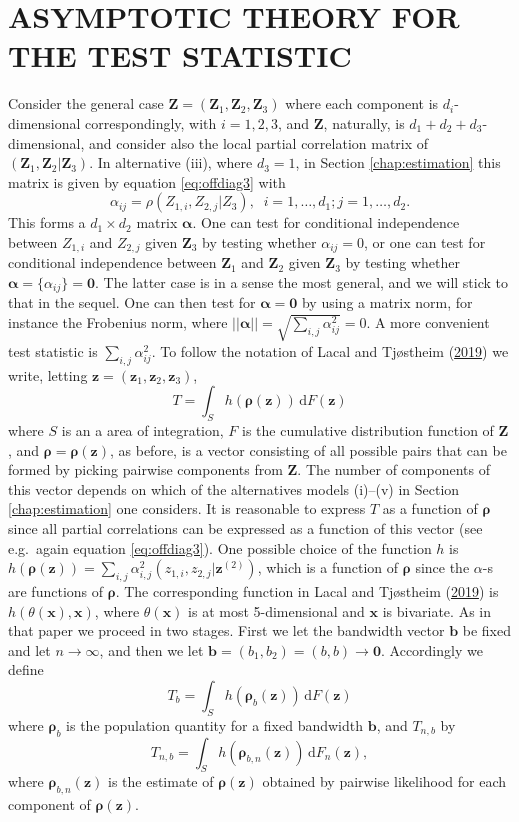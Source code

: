 \documentclass[
  12pt,
  letterpaper]{article}
\numberwithin{equation}{section}
\newcommand{\x}{\bm{x}}
\newcommand{\Z}{\bm{Z}}
\newcommand{\z}{\bm{z}}
\newcommand{\ztwo}{\bm{z}^{(2)}}
\newcommand{\frho}{\bm{\rho}}
\newcommand{\bb}{\bm{b}}
\newcommand{\falpha}{\bm{\alpha}}
\newcommand{\di}{\,\textrm{d}}
\begin{document}
\hypertarget{asym-test}{%
\section{ASYMPTOTIC THEORY FOR THE TEST STATISTIC}\label{asym-test}}

Consider the general case \(\Z = (\Z_1, \Z_2, \Z_3)\) where each component is \(d_i\)-dimensional correspondingly, with \(i = 1,2,3\), and \(\Z\), naturally, is \(d_1+d_2+d_3\)-dimensional, and consider also the local partial correlation matrix of \((\Z_1,\Z_2|\Z_3)\). In alternative (iii), where \(d_3 = 1\), in Section \ref{chap:estimation} this matrix is given by equation \eqref{eq:offdiag3} with
\[
\alpha_{ij} = \rho(Z_{1,i},Z_{2,j}|Z_3), \;\; i=1,\ldots,d_1; j = 1,\dots,d_2.
\]
This forms a \(d_1 \times d_2\) matrix \({\falpha}\). One can test for conditional independence between \(Z_{1,i}\) and \(Z_{2,j}\) given \(\Z_3\) by testing whether \(\alpha_{ij}=0\), or one can test for conditional independence between \(\Z_1\) and \(\Z_2\) given \(\Z_3\) by testing whether \({\falpha} = \{\alpha_{ij}\} = {\bm{0}}\). The latter case is in a sense the most general, and we will stick to that in the sequel. One can then test for \({\falpha} = {\bm{0}}\) by using a matrix norm, for instance the Frobenius norm, where \(||{\falpha}|| = \sqrt{\sum_{i,j} \alpha_{ij}^2} = 0\). A more convenient test statistic is \(\sum_{i,j} \alpha_{ij}^2\). To follow the notation of Lacal and Tjøstheim (\protect\hyperlink{ref-lacal2018estimating}{2019}) we write, letting \(\z=(\z_1,\z_2,\z_3)\),
\[
T = \int_S h(\frho(\z)) \di F(\z)
\]
where \(S\) is an a area of integration, \(F\) is the cumulative distribution function of \(\Z\), and \(\frho = \frho(\z)\), as before, is a vector consisting of all possible pairs that can be formed by picking pairwise components from \(\Z\). The number of components of this vector depends on which of the alternatives models (i)--(v) in Section \ref{chap:estimation} one considers. It is reasonable to express \(T\) as a function of \(\frho\) since all partial correlations can be expressed as a function of this vector (see e.g.~again equation \eqref{eq:offdiag3}). One possible choice of the function \(h\) is \(h(\frho(\z)) = \sum_{i,j} \alpha_{i,j}^2(z_{1,i},z_{2,j}|\ztwo)\), which is a function of \(\frho\) since the \(\alpha\)-s are functions of \(\frho\). The corresponding function in Lacal and Tjøstheim (\protect\hyperlink{ref-lacal2018estimating}{2019}) is \(h(\theta(\x), \x)\), where \(\theta(\x)\) is at most 5-dimensional and \(\x\) is bivariate. As in that paper we proceed in two stages. First we let the bandwidth vector \(\bb\) be fixed and let \(n \to \infty\), and then we let \(\bb = (b_1,b_2) = (b,b) \to \bm{0}\).
Accordingly we define
\[
T_b = \int_S h(\frho_b(\z)) \di F(\z) 
\]
where \(\frho_b\) is the population quantity for a fixed bandwidth \(\bb\), and \(T_{n,b}\) by
\[
T_{n,b} = \int_S h(\frho_{b,n}(\z)) \di F_n(\z),
\]
where \(\frho_{b,n}(\z)\) is the estimate of \(\frho(\z)\) obtained by pairwise likelihood for each component of \(\frho(\z)\).
\end{document}
